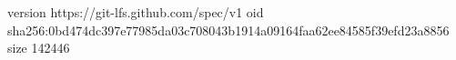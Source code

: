 version https://git-lfs.github.com/spec/v1
oid sha256:0bd474dc397e77985da03c708043b1914a09164faa62ee84585f39efd23a8856
size 142446
